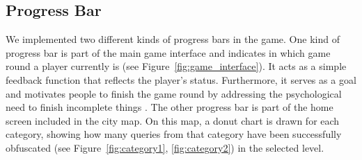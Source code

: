 \subsection*{Progress Bar}
We implemented two different kinds of progress bars in the game.
One kind of progress bar is part of the main game interface and indicates in which game round a player currently is (see Figure~\ref{fig:game_interface}). It acts as a simple feedback function that reflects the player's status. Furthermore, it serves as a goal and motivates people to finish the game round by addressing the psychological need to finish incomplete things \cite{actionableGamification}. The other progress bar is part of the home screen included in the city map. On this map, a donut chart is drawn for each category, showing how many queries from that category have been successfully obfuscated (see Figure~\ref{fig:category1}, \ref{fig:category2}) in the selected level.
